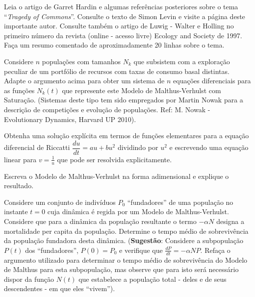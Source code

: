 
\begin{exercise}
    Leia o artigo de Garret Hardin e algumas referências posteriores sobre o tema ``\textit{Tragedy of Commons}''. Consulte o texto de Simon Levin e visite a página deste importante autor. Consulte também o artigo de Luwig - Walter e Holling no primeiro número da revista (online - acesso livre) Ecology and Society de 1997. Faça um resumo comentado de aproximadamente 20 linhas sobre o tema.
\end{exercise}


    \begin{exercise}
    Considere \(n\) populações com tamanhos \(N_k\) que subsistem com a exploração peculiar de um portfólio de recursos com taxas de consumo basal distintas. Adapte o argumento acima para obter um sistema de \(n\) equações diferenciais para as funções \(N_k(t)\) que represente este Modelo de Malthus-Verhulst com Saturação. (Sistemas deste tipo tem sido empregados por Martin Nowak para a descrição de competições e evolução de populações. Ref: M. Nowak - Evolutionary Dynamics, Harvard UP 2010).
    \end{exercise}

    \begin{exercise}
    Obtenha uma solução explícita em termos de funções elementares para a equação diferencial de Riccatti \(\dfrac{du}{dt} = au + bu^2\) dividindo por \(u^2\) e escrevendo uma equação linear para \(v = \frac{1}{u}\) que pode ser resolvida explicitamente.
    \end{exercise}

    \begin{exercise}
    Escreva o Modelo de Malthus-Verhulst na forma adimensional e explique o resultado. 
    \end{exercise}

    \begin{exercise}
    Considere um conjunto de indivíduos \(P_0\) ``fundadores'' de uma população no instante \(t=0\) cuja dinâmica é regida por um Modelo de Malthus-Verhulst. Considere que para a dinâmica da população resultante o termo \(-\alpha N\) designa a mortalidade per capita da população. Determine o tempo médio de sobrevivência da população fundadora desta dinâmica. (\textbf{Sugestão}: Considere a subpopulação \(P(t)\) dos ``fundadores'', \(P(0) = P_0\) e verifique que \(\frac{dP}{dt} = -\alpha NP\). Refaça o argumento utilizado para determinar o tempo médio de sobrevivência do Modelo de Malthus para esta subpopulação, mas observe que para isto será necessário dispor da função \(N(t)\) que estabelece a população total - deles e de seus descendentes - em que eles ``vivem'').
    \end{exercise}

